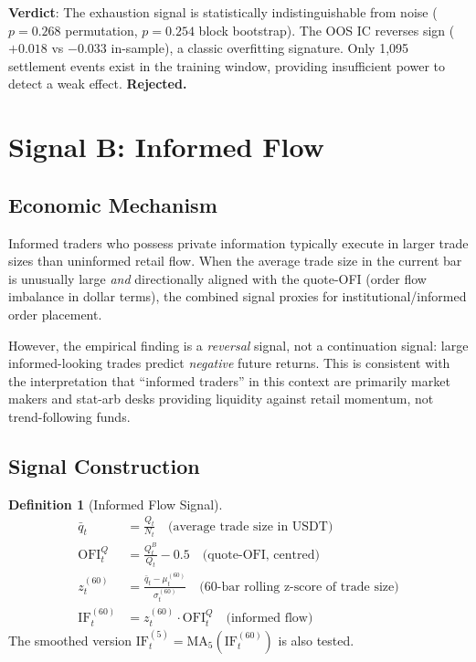 \documentclass[12pt, a4paper]{article}
\theoremstyle{definition}
\newtheorem{definition}{Definition}[section]
\begin{document}
\textbf{Verdict}: The exhaustion signal is statistically indistinguishable
from noise ($p = 0.268$ permutation, $p = 0.254$ block bootstrap). The OOS
IC reverses sign ($+0.018$ vs $-0.033$ in-sample), a classic overfitting
signature. Only 1,095 settlement events exist in the training window,
providing insufficient power to detect a weak effect. \textbf{Rejected.}


\section{Signal B: Informed Flow}

\subsection{Economic Mechanism}

Informed traders who possess private information typically execute in larger
trade sizes than uninformed retail flow. When the average trade size in the
current bar is unusually large \emph{and} directionally aligned with the
quote-OFI (order flow imbalance in dollar terms), the combined signal
proxies for institutional/informed order placement.

However, the empirical finding is a \emph{reversal} signal, not a
continuation signal: large informed-looking trades predict \emph{negative}
future returns. This is consistent with the interpretation that
``informed traders'' in this context are primarily market makers and stat-arb
desks providing liquidity against retail momentum, not trend-following funds.

\subsection{Signal Construction}

\begin{definition}[Informed Flow Signal]
  \begin{align}
    \bar{q}_t &= \frac{Q_t}{N_t} \quad \text{(average trade size in USDT)}\\
    \text{OFI}^Q_t &= \frac{Q_t^B}{Q_t} - 0.5 \quad \text{(quote-OFI, centred)}\\
    z_t^{(60)} &= \frac{\bar{q}_t - \mu_t^{(60)}}{\sigma_t^{(60)}}
    \quad \text{(60-bar rolling z-score of trade size)}\\
    \text{IF}_t^{(60)} &= z_t^{(60)} \cdot \text{OFI}^Q_t
    \quad \text{(informed flow)}
  \end{align}
  The smoothed version $\text{IF}_t^{(5)} = \text{MA}_5(\text{IF}_t^{(60)})$
  is also tested.
\end{definition}
\end{document}
